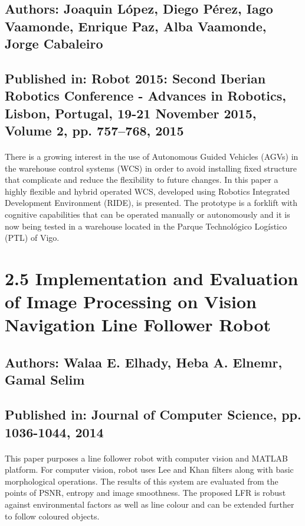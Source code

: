 \subsection*{Authors: Joaquin L\'{o}pez, Diego P\'{e}rez, Iago Vaamonde, Enrique Paz, Alba Vaamonde, Jorge Cabaleiro}
\subsection*{Published in: Robot 2015: Second Iberian Robotics Conference - Advances in Robotics, Lisbon, Portugal, 19-21 November 2015, Volume 2, pp. 757–768, 2015}
\paragraph{}There is a growing interest in the use of Autonomous Guided Vehicles (AGVs) in the warehouse control systems (WCS) in order to avoid installing fixed structure that complicate and reduce the flexibility to future changes. In this paper a highly flexible and hybrid operated WCS, developed using Robotics Integrated Development Environment (RIDE), is presented. The prototype is a forklift with cognitive capabilities that can be operated manually or autonomously and it is now being tested in a warehouse located in the Parque Technológico Logístico (PTL) of Vigo.

\section*{2.5 Implementation and Evaluation of Image Processing on Vision Navigation Line Follower Robot\cite{WElhady}}
\subsection*{Authors: Walaa E. Elhady, Heba A. Elnemr, Gamal Selim}
\subsection*{Published in: Journal of Computer Science, pp. 1036-1044, 2014}
\paragraph{}This paper purposes a line follower robot with computer vision and MATLAB platform. For computer vision, robot uses Lee and Khan filters along with basic morphological operations. The results of this system are evaluated from the points of PSNR, entropy and image smoothness. The proposed LFR is robust against environmental factors as well as line colour and can be extended further to follow coloured objects.


